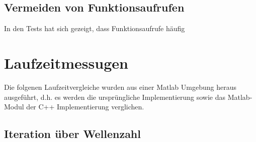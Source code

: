 \subsection{Vermeiden von Funktionsaufrufen}

In den Tests hat sich gezeigt, dass Funktionsaufrufe häufig 

\section{Laufzeitmessugen}

Die folgenen Laufzeitvergleiche wurden aus einer Matlab Umgebung heraus ausgeführt, d.h. es werden die ursprüngliche Implementierung sowie das Matlab-Modul der C++ Implementierung verglichen.

\subsection{Iteration über Wellenzahl}

